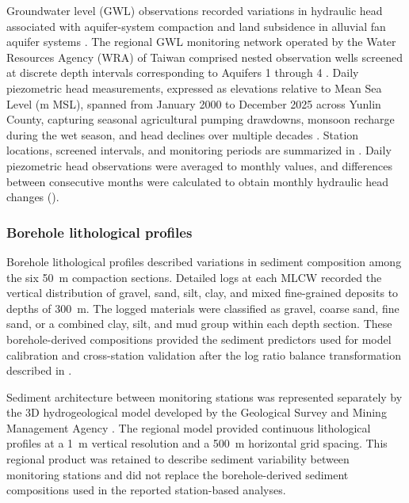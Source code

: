 Groundwater level (GWL) observations recorded variations in hydraulic head associated with aquifer-system compaction and land subsidence in alluvial fan aquifer systems \citep{galloway_land_1999, gambolati_2015, herrera-garcia_mapping_2021, bagheri-gavkoshLandSubsidenceGlobal2021}. The regional GWL monitoring network operated by the Water Resources Agency (WRA) of Taiwan comprised nested observation wells screened at discrete depth intervals corresponding to Aquifers 1 through 4 \citep{survey_project_1999, liu_characterization_2004}. Daily piezometric head measurements, expressed as elevations relative to Mean Sea Level (m MSL), spanned from January 2000 to December 2025 across Yunlin County, capturing seasonal agricultural pumping drawdowns, monsoon recharge during the wet season, and head declines over multiple decades \citep{chang2022_wetanddry, lu2020_crfp}. Station locations, screened intervals, and monitoring periods are summarized in . Daily piezometric head observations were averaged to monthly values, and differences between consecutive months were calculated to obtain monthly hydraulic head changes ().

\subsubsection{Borehole lithological profiles}

Borehole lithological profiles described variations in sediment composition among the six 50~m compaction sections. Detailed logs at each MLCW recorded the vertical distribution of gravel, sand, silt, clay, and mixed fine-grained deposits to depths of 300~m. The logged materials were classified as gravel, coarse sand, fine sand, or a combined clay, silt, and mud group within each depth section. These borehole-derived compositions provided the sediment predictors used for model calibration and cross-station validation after the log ratio balance transformation described in .

Sediment architecture between monitoring stations was represented separately by the 3D hydrogeological model developed by the Geological Survey and Mining Management Agency \citep{gsmma_3d}. %
The regional model provided continuous lithological profiles at a 1~m vertical resolution and a 500~m horizontal grid spacing. This regional product was retained to describe sediment variability between monitoring stations and did not replace the borehole-derived sediment compositions used in the reported station-based analyses.

